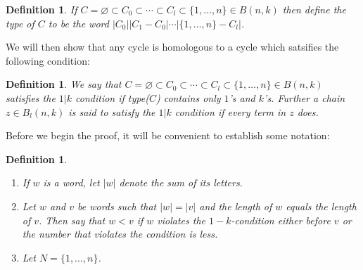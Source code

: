 \documentclass{elsart}
\newtheorem{definition}[theorem]{Definition}
\newcommand{\GC}{\varnothing \subset C_0 \subset \cdots \subset C_l \subset \{1, \ldots, n\}}
\begin{document}
\begin{definition} 
  If $C=\GC \in B(n ,k)$ then define the type of $C$ to be the word $|C_0||C_1 - C_0| \cdots |\{1, \ldots, n\} - C_l|$.
\end{definition}

We will then show that any cycle is homologous to a cycle which satsifies the following condition:

\begin{definition}
  We say that $C=\GC \in B(n, k)$ satisfies the $1|k$ condition if type($C$) contains only $1$'s and $k$'s. Further a chain
  $z \in B_l(n, k)$ is said to satisfy the $1|k$ condition if every term in $z$ does.
\end{definition}

Before we begin the proof, it will be convenient to establish some notation:
\begin{definition}  
  \begin{enumerate}
        \item If $w$ is a word, let $|w|$ denote the sum of its letters.
        \item Let $w$ and $v$ be words such that $|w| = |v|$ and the length of $w$ equals the length of $v$. Then say
              that $w < v$ if $w$ violates the $1-k$-condition either before $v$ or the number that violates the condition
              is less. 
        \item Let $N = \{1, \ldots, n \}$.
     \end{enumerate}
\end{definition}
\end{document}
